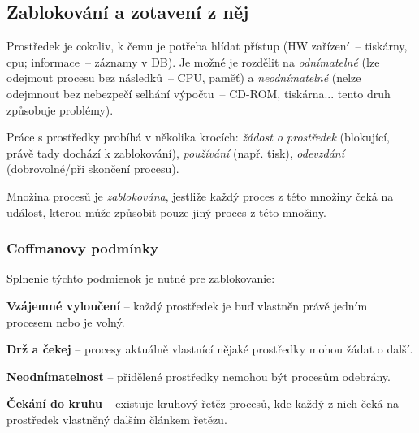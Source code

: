 \subsection{Zablokování a zotavení z něj}

Prostředek je cokoliv, k čemu je potřeba hlídat přístup (HW zařízení~-- tiskárny, cpu; informace~-- záznamy v DB). Je možné je rozdělit na \emph{odnímatelné} (lze odejmout procesu bez následků~-- CPU, paměť) a \emph{neodnímatelné} (nelze odejmnout bez nebezpečí selhání výpočtu~-- CD-ROM, tiskárna... tento druh způsobuje problémy).

Práce s prostředky probíhá v několika krocích: \emph{žádost o prostředek} (blokující, právě tady dochází k zablokování), \emph{používání} (např. tisk), \emph{odevzdání} (dobrovolné/při skončení procesu).

Množina procesů je \emph{zablokována}, jestliže každý proces z této množiny čeká na událost, kterou může způsobit pouze jiný proces z této množiny.

\subsubsection*{Coffmanovy podmínky}
Splnenie týchto podmienok je nutné pre zablokovanie:
\begin{penumerate}
	\item \textbf{Vzájemné vyloučení} – každý prostředek je buď vlastněn právě jedním procesem nebo je volný.
	\item \textbf{Drž a čekej} – procesy aktuálně vlastnící nějaké prostředky mohou žádat o další.
	\item \textbf{Neodnímatelnost} – přidělené prostředky nemohou být procesům odebrány.
	\item \textbf{Čekání do kruhu} – existuje kruhový řetěz procesů, kde každý z nich čeká na prostředek vlastněný dalším článkem řetězu.
\end{penumerate}

